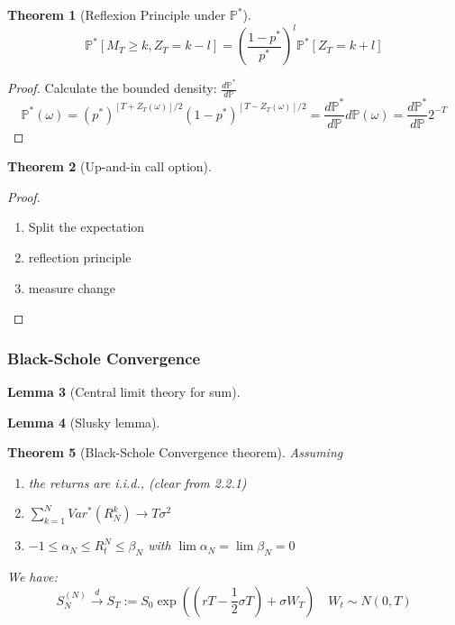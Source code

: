 \documentclass[a4paper,11pt]{book}
\newtheorem{theorem}{Theorem}[section]
\newtheorem{lemma}[theorem]{Lemma}
\theoremstyle{definition}
\theoremstyle{remark}
\begin{document}
\begin{theorem}[Reflexion Principle under $\mathbb{P}^*$]
\begin{equation*}
	\mathbb{P}^*[M_T \geq k, Z_T = k - l] = \left( \frac{1-p^*}{p^*} \right)^l \mathbb{P}^*[Z_T = k + l]
\end{equation*}
\end{theorem}
\begin{proof}
	Calculate the bounded density: $\frac{d\mathbb{P}^*}{d\mathbb{P}}$
	\begin{equation*}
		\mathbb{P}^*(\omega) = (p^*)^{[T + Z_T(\omega)]/2}(1-p^*)^{[T - Z_T(\omega)]/2} = \frac{d\mathbb{P}^*}{d\mathbb{P}} d\mathbb{P}(\omega) = \frac{d\mathbb{P}^*}{d\mathbb{P}} 2^{-T} 
	\end{equation*}
\end{proof}

\begin{theorem}[Up-and-in call option]
\end{theorem}
\begin{proof} \quad
	\begin{enumerate}
		\item Split the expectation
		\item reflection principle
		\item measure change
	\end{enumerate}
\end{proof}

\subsubsection*{Black-Schole Convergence}
\begin{lemma}[Central limit theory for sum]
\end{lemma}

\begin{lemma}[Slusky lemma]
\end{lemma}

\begin{theorem}[Black-Schole Convergence theorem]
Assuming
\begin{enumerate}
	\item the returns are i.i.d., (clear from 2.2.1)
	\item $\sum_{k = 1}^N Var^*(R_N^k) \rightarrow T\sigma^2$
	\item $-1 \leq \alpha_N \leq R^N_t \leq \beta_N$ with $\lim \alpha_N = \lim \beta_N = 0$
\end{enumerate}
We have:
\begin{equation*}
	S^{(N)}_{N} \overset{d}{\longrightarrow} S_T:= S_0\exp\left((rT - \frac{1}{2}\sigma T) + \sigma W_T \right) \quad W_t \sim N(0, T) 
\end{equation*}
\end{theorem}
\end{document}
